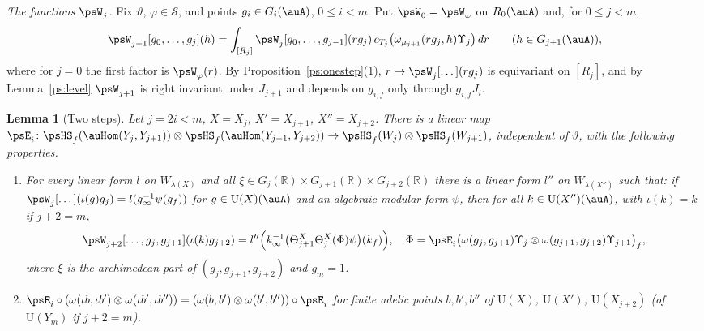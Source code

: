 \documentclass[10pt]{amsart}
\newtheorem{lemma}[theorem]{Lemma}
\theoremstyle{definition}
\theoremstyle{remark}
\newcommand{\R}{\mathbb R}
\providecommand{\auS}{\mathcal S}
\providecommand{\auU}{\mathrm U}
\begin{document}
\emph{The functions $\psW_j$.} Fix $\vartheta$, $\varphi\in\auS$, and points $g_i\in G_i(\auA)$,
$0\le i<m$. Put $\psW_0=\psW_\varphi$ on $R_0(\auA)$ and, for $0\le j<m$,
\[
\psW_{j+1}[g_0,\dots,g_j](h)=\int_{[R_j]}\psW_j[g_0,\dots,g_{j-1}](rg_j)\,c_{T_j}\bigl(
\omega_{\mu_{j+1}}(rg_j,h)\Upsilon_j\bigr)\,dr\qquad(h\in G_{j+1}(\auA)),
\]
where for $j=0$ the first factor is $\psW_\varphi(r)$. By Proposition~\ref{ps:onestep}(1),
$r\mapsto\psW_j[\dots](rg_j)$ is equivariant on $[R_j]$, and by Lemma~\ref{ps:level} $\psW_{j+1}$ is
right invariant under $J_{j+1}$ and depends on $g_{i,f}$ only through $g_{i,f}J_i$.

\begin{lemma}[Two steps]\label{ps:double}
Let $j=2i<m$, $X=X_j$, $X'=X_{j+1}$, $X''=X_{j+2}$. There is a linear map $\psE_i\colon
\psHS_f(\auHom(Y_j,Y_{j+1}))\otimes\psHS_f(\auHom(Y_{j+1},Y_{j+2}))\to\psHS_f(W_j)\otimes
\psHS_f(W_{j+1})$, independent of $\vartheta$, with the following properties.
\begin{enumerate}
\item[(a)] For every linear form $l$ on $W_{\lambda(X)}$ and all $\xi\in G_j(\R)\times G_{j+1}(\R)
\times G_{j+2}(\R)$ there is a linear form $l''$ on $W_{\lambda(X'')}$ such that: if
$\psW_j[\dots](\iota(g)g_j)=l(g_\infty^{-1}\psi(g_f))$ for $g\in\auU(X)(\auA)$ and an algebraic
modular form $\psi$, then for all $k\in\auU(X'')(\auA)$, with $\iota(k)=k$ if $j+2=m$,
\[
\psW_{j+2}[\dots,g_j,g_{j+1}](\iota(k)g_{j+2})=l''\Bigl(k_\infty^{-1}\bigl(\Theta^X_{j+1}\Theta^X_j
(\Phi)\psi\bigr)(k_f)\Bigr),\quad\Phi=\psE_i\bigl(\omega(g_j,g_{j+1})\Upsilon_{j}\otimes\omega(g_{j+1},
g_{j+2})\Upsilon_{j+1}\bigr)_f,
\]
where $\xi$ is the archimedean part of $(g_j,g_{j+1},g_{j+2})$ and $g_m=1$.
\item[(b)] $\psE_i\circ(\omega(\iota b,\iota b')\otimes\omega(\iota b',\iota b''))=(\omega(b,b')
\otimes\omega(b',b''))\circ\psE_i$ for finite adelic points $b,b',b''$ of $\auU(X)$, $\auU(X')$,
$\auU(X_{j+2})$ (of $\auU(Y_m)$ if $j+2=m$).
\end{enumerate}
\end{lemma}
\end{document}

